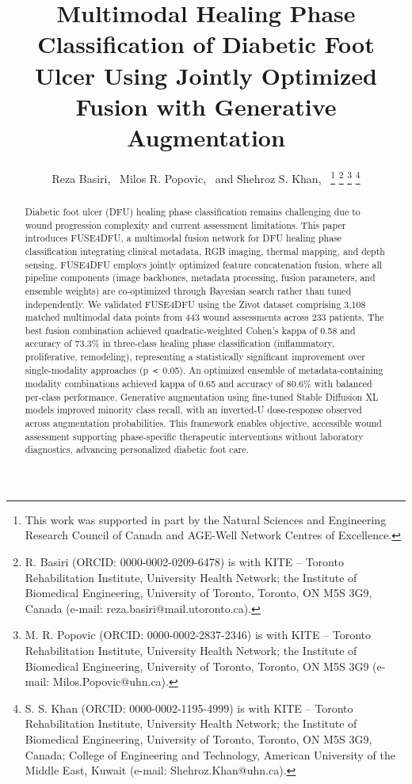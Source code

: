 \documentclass[journal,twoside,web]{ieeecolor}
\begin{document}
\title{Multimodal Healing Phase Classification of Diabetic Foot Ulcer Using Jointly Optimized Fusion with Generative Augmentation}

\author{Reza Basiri,~
        Milos R. Popovic,~
        and Shehroz S. Khan,~
\thanks{This work was supported in part by the Natural Sciences and Engineering Research Council of Canada and AGE-Well Network Centres of Excellence.}
\thanks{R. Basiri (ORCID: 0000-0002-0209-6478) is with KITE – Toronto Rehabilitation Institute, University Health Network; the Institute of Biomedical Engineering, University of Toronto, Toronto, ON M5S 3G9, Canada (e-mail: reza.basiri@mail.utoronto.ca).}
\thanks{M. R. Popovic (ORCID: 0000-0002-2837-2346) is with KITE – Toronto Rehabilitation Institute, University Health Network; the Institute of Biomedical Engineering, University of Toronto, Toronto, ON M5S 3G9 (e-mail: Milos.Popovic@uhn.ca).}
\thanks{S. S. Khan (ORCID: 0000-0002-1195-4999) is with KITE – Toronto Rehabilitation Institute, University Health Network; the Institute of Biomedical Engineering, University of Toronto, Toronto, ON M5S 3G9, Canada; College of Engineering and Technology, American University of the Middle East, Kuwait (e-mail: Shehroz.Khan@uhn.ca).}}

\maketitle

\begin{abstract}
Diabetic foot ulcer (DFU) healing phase classification remains challenging due to wound progression complexity and current assessment limitations. This paper introduces FUSE4DFU, a multimodal fusion network for DFU healing phase classification integrating clinical metadata, RGB imaging, thermal mapping, and depth sensing. FUSE4DFU employs jointly optimized feature concatenation fusion, where all pipeline components (image backbones, metadata processing, fusion parameters, and ensemble weights) are co\nobreakdash-optimized through Bayesian search rather than tuned independently. We validated FUSE4DFU using the Zivot dataset comprising 3,108 matched multimodal data points from 443 wound assessments across 233 patients. The best fusion combination achieved quadratic\nobreakdash-weighted Cohen's kappa of 0.58 and accuracy of 73.3\% in three\nobreakdash-class healing phase classification (inflammatory, proliferative, remodeling), representing a statistically significant improvement over single\nobreakdash-modality approaches (p~\texttt{<}~0.05). An optimized ensemble of metadata\nobreakdash-containing modality combinations achieved kappa of 0.65 and accuracy of 80.6\% with balanced per\nobreakdash-class performance. Generative augmentation using fine\nobreakdash-tuned Stable Diffusion XL models improved minority class recall, with an inverted\nobreakdash-U dose\nobreakdash-response observed across augmentation probabilities. This framework enables objective, accessible wound assessment supporting phase\nobreakdash-specific therapeutic interventions without laboratory diagnostics, advancing personalized diabetic foot care.
\end{abstract}
\end{document}
